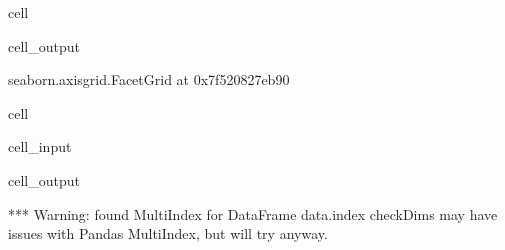 \documentclass[letterpaper,table,10pt,english]{jupyterBook}
\begin{document}
\begin{sphinxuseclass}{cell}
\begin{sphinxVerbatimOutput}
\begin{sphinxuseclass}{cell_output}
\begin{sphinxVerbatim}[commandchars=\\\{\}]
\PYGZlt{}seaborn.axisgrid.FacetGrid at 0x7f520827eb90\PYGZgt{}
\end{sphinxVerbatim}

\noindent{}

\end{sphinxuseclass}\end{sphinxVerbatimOutput}

\end{sphinxuseclass}
\begin{sphinxuseclass}{cell}\begin{sphinxVerbatimInput}

\begin{sphinxuseclass}{cell_input}
\begin{sphinxVerbatim}[commandchars=\\\{\}]
   
       
                      
\end{sphinxVerbatim}

\end{sphinxuseclass}\end{sphinxVerbatimInput}
\begin{sphinxVerbatimOutput}

\begin{sphinxuseclass}{cell_output}
\begin{sphinxVerbatim}[commandchars=\\\{\}]
*** Warning: found MultiIndex for DataFrame data.index \PYGZhy{} checkDims may have issues with Pandas MultiIndex, but will try anyway.
\end{sphinxVerbatim}


\end{sphinxuseclass}
\end{sphinxVerbatimOutput}
\end{sphinxuseclass}
\end{document}

